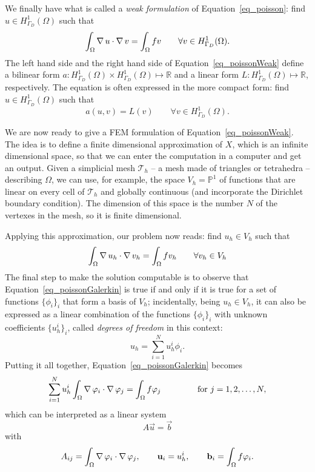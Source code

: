 We finally have what is called a \emph{weak formulation} of
Equation~\eqref{eq_poisson}: find \(u \in H^1_{\Gamma_D}(\Omega)\) such
that
\begin{equation}
  \int_\Omega \operatorname{\nabla} u \cdot \operatorname{\nabla} v = \int_\Omega f v \qquad \forall v
  \in H^1_{\Gamma_D}(\Omega).
  \label{eq_poissonWeak}
\end{equation}
The left hand side and the right hand side of Equation~\eqref{eq_poissonWeak} define a
bilinear form \(a : H^1_{\Gamma_D}(\Omega) \times H^1_{\Gamma_D}(\Omega)
\mapsto \mathbb{R}\) and a linear form \(L : H^1_{\Gamma_D}(\Omega)
\mapsto \mathbb{R}\), respectively.
The equation is often expressed in the more compact form: find \(u \in
H^1_{\Gamma_D}(\Omega)\) such that
\begin{equation}
  a(u, v) = L(v)  \qquad \forall v \in H^1_{\Gamma_D}(\Omega).
  \label{eq_poissonForms}
\end{equation}

We are now ready to give a FEM formulation of
Equation~\eqref{eq_poissonWeak}.
The idea is to define a finite dimensional approximation of \(X\), which
is an infinite dimensional space, so that
we can enter the computation in a computer and get an output.
Given a simplicial mesh \(\mathcal{T}_h\) -- a mesh made of triangles or tetrahedra --
describing \(\Omega\), we can use, for example, the space \(V_h =
\mathbb{P}^1\) of functions
that are linear on every cell of \(\mathcal{T}_h\) and globally
continuous (and incorporate the Dirichlet boundary condition).
The dimension of this space is the number \(N\) of the vertexes in the mesh, so
it is finite dimensional.

Applying this approximation, our problem now reads: find \(u_h \in V_h\)
such that
\begin{equation}
  \int_{\Omega} \operatorname{\nabla} u_h \cdot \operatorname{\nabla} v_h = \int_{\Omega} f v_h \qquad
  \forall v_h \in V_h
  \label{eq_poissonGalerkin}
\end{equation}
The final step to make the solution computable is to observe that
Equation~\eqref{eq_poissonGalerkin} is true if and only if it is true for
a set of functions \(\{\phi_i\}_i\) that form a basis of \(V_h\);
incidentally, being \(u_h \in V_h\), it can also be expressed as a linear
combination of the functions \(\{\phi_i\}_i\) with unknown coefficients
\(\{u_h^i\}_i\), called \emph{degrees of freedom} in this context:
\[
  u_h = \sum_{i=1}^N u_h^i \phi_i.
\]
Putting it all together, Equation~\eqref{eq_poissonGalerkin} becomes
\begin{equation}
  \sum_{i=1}^N u_h^i \int_{\Omega} \operatorname{\nabla} \varphi_i \cdot \operatorname{\nabla} \varphi_j
  = \int_{\Omega} f \varphi_j \qquad
  \qquad \text{ for } j = 1, 2, \dots, N,
  \label{eq_poissonFEM}
\end{equation}
which can be interpreted as a linear system
\[
  A \vec{u} = \vec{b}
\]
with
\[
  A_{ij} = \int_{\Omega} \operatorname{\nabla} \varphi_i \cdot \operatorname{\nabla} \varphi_j, \qquad
  \mathbf{u}_i = u_h^i, \qquad \mathbf{b}_i = \int_{\Omega} f \varphi_i.
\]

